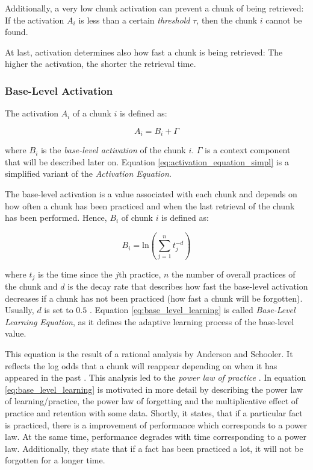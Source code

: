 Additionally, a very low chunk activation can prevent a chunk of being retrieved: If the activation $A_i$ is less than a certain \emph{threshold} $\tau$, then the chunk $i$ cannot be found.

At last, activation determines also how fast a chunk is being retrieved: The higher the activation, the shorter the retrieval time.

\subsubsection{Base-Level Activation}

The activation $A_i$ of a chunk $i$ is defined as:

\begin{equation}
 \label{eq:activation_equation_simpl}
 A_i = B_i + \Gamma
\end{equation}

where $B_i$ is the \emph{base-level activation} of the chunk $i$. $\Gamma$ is a context component that will be described later on. Equation \eqref{eq:activation_equation_simpl} is a simplified variant of the \emph{Activation Equation}.

The base-level activation is a value associated with each chunk and depends on how often a chunk has been practiced and when the last retrieval of the chunk has been performed. Hence, $B_i$ of chunk $i$ is defined as:

\begin{equation}
\label{eq:base_level_learning}
B_i = \mathrm{ln}\left(\sum_{j=1}^n{t_j^{-d}}\right)
\end{equation}

where $t_j$ is the time since the $j$th practice, $n$ the number of overall practices of the chunk and $d$ is the decay rate that describes how fast the base-level activation decreases if a chunk has not been practiced (how fast a chunk will be forgotten). Usually, $d$ is set to $0.5$ \cite[p. 1042]{anderson_integrated_2004}. Equation \eqref{eq:base_level_learning} is called \emph{Base-Level Learning Equation}, as it defines the adaptive learning process of the base-level value.

This equation is the result of a rational analysis by Anderson and Schooler. It reflects the log odds that a chunk will reappear depending on when it has appeared in the past \cite[p. 33]{taatgen_modeling_2006}. This analysis led to the \emph{power law of practice} \cite[p. 1042]{anderson_integrated_2004}. In \cite[pp. 8--11]{anderson_implications_2000} equation \eqref{eq:base_level_learning} is motivated in more detail by describing the power law of learning/practice, the power law of forgetting and the multiplicative effect of practice and retention with some data. Shortly, it states, that if a particular fact is practiced, there is a improvement of performance which corresponds to a power law. At the same time, performance degrades with time corresponding to a power law. Additionally, they state that if a fact has been practiced a lot, it will not be forgotten for a longer time.

